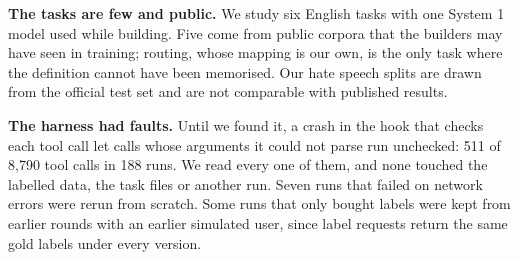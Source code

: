 \documentclass[11pt]{article}
\begin{document}
\textbf{The tasks are few and public.} We study six English tasks with one System 1 model used while building. Five come from public corpora that the builders may have seen in training; routing, whose mapping is our own, is the only task where the definition cannot have been memorised. Our hate speech splits are drawn from the official test set and are not comparable with published results.

\textbf{The harness had faults.} Until we found it, a crash in the hook that checks each tool call let calls whose arguments it could not parse run unchecked: 511 of 8,790 tool calls in 188 runs. We read every one of them, and none touched the labelled data, the task files or another run. Seven runs that failed on network errors were rerun from scratch. Some runs that only bought labels were kept from earlier rounds with an earlier simulated user, since label requests return the same gold labels under every version.


\end{document}
